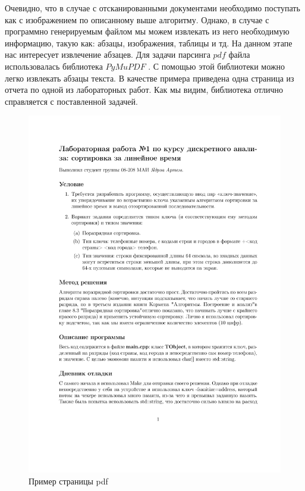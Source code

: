 Очевидно, что в случае с отсканированными документами необходимо поступать как с изображением по описанному выше алгоритму. Однако, в случае с программно генерируемым файлом мы можем извлекать из него необходимую информацию, такую как: абзацы, изображения, таблицы и тд.
На данном этапе нас интересует извлечение абзацев. Для задачи парсинга $pdf$ файла использовалась библиотека $PyMuPDF$ \cite{PyMuPDF}. С помощью этой библиотеки можно легко извлекать абзацы текста. В качестве примера приведена одна страница из отчета по одной из лабораторных работ. Как мы видим, библиотека отлично справляется с поставленной задачей.
\begin{figure}
    \includegraphics[scale=0.65]{img/paragraph/pdf_input.jpg}
    \caption{Пример страницы pdf}
    \label{segmentation_pdf_input}
\end{figure}

